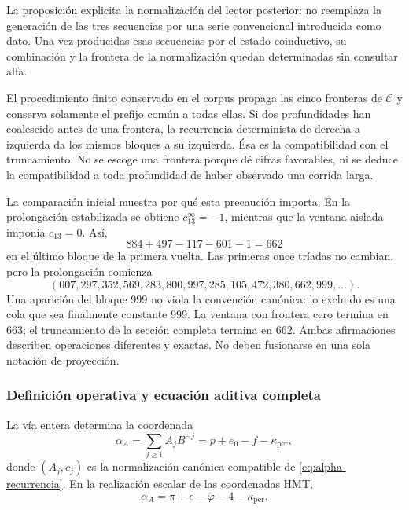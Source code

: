 La proposición explicita la normalización del lector posterior: no
reemplaza la generación de las tres secuencias por una serie convencional
introducida como dato. Una vez producidas esas secuencias por el estado
coinductivo, su combinación y la frontera de la normalización quedan
determinadas sin consultar alfa.

El procedimiento finito conservado en el corpus propaga las cinco
fronteras de \(\mathcal C\) y conserva solamente el prefijo común a
todas ellas. Si dos profundidades han coalescido antes de una frontera,
la recurrencia determinista de derecha a izquierda da los mismos bloques
a su izquierda. Ésa es la compatibilidad con el truncamiento. No se
escoge una frontera porque dé cifras favorables, ni se deduce la
compatibilidad a toda profundidad de haber observado una corrida larga.

La comparación inicial muestra por qué esta precaución importa. En la
prolongación estabilizada se obtiene \(c_{13}^{\infty}=-1\), mientras
que la ventana aislada imponía \(c_{13}=0\). Así,
\[
 884+497-117-601-1=662
\]
en el último bloque de la primera vuelta. Las primeras once tríadas no
cambian, pero la prolongación comienza
\[
 (007,297,352,569,283,800,997,285,105,472,380,662,999,\ldots).
\]
Una aparición del bloque 999 no viola la convención canónica: lo
excluido es una cola que sea finalmente constante 999. La ventana con
frontera cero termina en 663; el truncamiento de la sección completa
termina en 662. Ambas afirmaciones describen operaciones diferentes y
exactas. No deben fusionarse en una sola notación de proyección.

\subsubsection{Definición operativa y ecuación aditiva completa}
\label{subsec:alpha-definicion}

\begin{definition}
\label{def:alpha-operativa}
La vía entera determina la coordenada
\begin{equation}
 \alpha_A=\sum_{j\geq1}A_jB^{-j}
 =p+e_0-f-\kappa_{\mathrm{per}},
 \label{eq:alpha-via-a}
\end{equation}
donde \((A_j,c_j)\) es la normalización canónica compatible de
\eqref{eq:alpha-recurrencia}. En la realización escalar de las
coordenadas HMT,
\begin{equation}
 \boxed{\alpha_A=
 \pi+e-\varphi
 -4-\kappa_{\mathrm{per}}.}
 \label{eq:alpha-identidad-completa}
\end{equation}
\end{definition}

